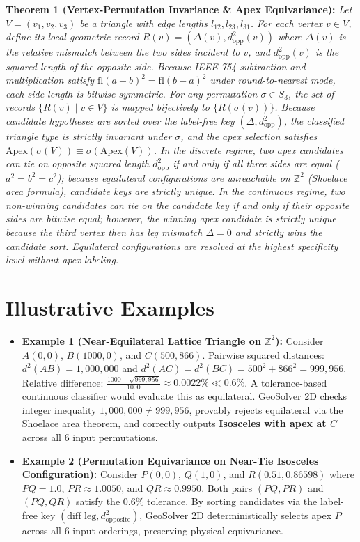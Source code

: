 \documentclass[preprint,12pt]{elsarticle}
\begin{document}
\textbf{Theorem 1 (Vertex-Permutation Invariance \& Apex Equivariance):}  
\textit{Let $V = (v_1, v_2, v_3)$ be a triangle with edge lengths $l_{12}, l_{23}, l_{31}$. For each vertex $v \in V$, define its local geometric record $R(v) = (\Delta(v), d^2_{\text{opp}}(v))$ where $\Delta(v)$ is the relative mismatch between the two sides incident to $v$, and $d^2_{\text{opp}}(v)$ is the squared length of the opposite side. Because IEEE-754 subtraction and multiplication satisfy $\text{fl}(a - b)^2 = \text{fl}(b - a)^2$ under round-to-nearest mode, each side length is bitwise symmetric. For any permutation $\sigma \in S_3$, the set of records $\{R(v) \mid v \in V\}$ is mapped bijectively to $\{R(\sigma(v))\}$. Because candidate hypotheses are sorted over the label-free key $(\Delta, d^2_{\text{opp}})$, the classified triangle type is strictly invariant under $\sigma$, and the apex selection satisfies $\text{Apex}(\sigma(V)) \equiv \sigma(\text{Apex}(V))$. In the discrete regime, two apex candidates can tie on opposite squared length $d^2_{\text{opp}}$ if and only if all three sides are equal ($a^2 = b^2 = c^2$); because equilateral configurations are unreachable on $\mathbb{Z}^2$ (Shoelace area formula), candidate keys are strictly unique. In the continuous regime, two non-winning candidates can tie on the candidate key if and only if their opposite sides are bitwise equal; however, the winning apex candidate is strictly unique because the third vertex then has leg mismatch $\Delta = 0$ and strictly wins the candidate sort. Equilateral configurations are resolved at the highest specificity level without apex labeling.}

\section{Illustrative Examples}
\begin{itemize}
    \item \textbf{Example 1 (Near-Equilateral Lattice Triangle on $\mathbb{Z}^2$):} Consider $A(0, 0)$, $B(1000, 0)$, and $C(500, 866)$. Pairwise squared distances: $d^2(AB) = 1,000,000$ and $d^2(AC) = d^2(BC) = 500^2 + 866^2 = 999,956$. Relative difference: $\frac{1000 - \sqrt{999,956}}{1000} \approx 0.0022\% \ll 0.6\%$. A tolerance-based continuous classifier would evaluate this as equilateral. GeoSolver 2D checks integer inequality $1,000,000 \ne 999,956$, provably rejects equilateral via the Shoelace area theorem, and correctly outputs \textbf{Isosceles with apex at $C$} across all 6 input permutations.
    \item \textbf{Example 2 (Permutation Equivariance on Near-Tie Isosceles Configuration):} Consider $P(0, 0)$, $Q(1, 0)$, and $R(0.51, 0.86598)$ where $PQ = 1.0$, $PR \approx 1.0050$, and $QR \approx 0.9950$. Both pairs $(PQ, PR)$ and $(PQ, QR)$ satisfy the $0.6\%$ tolerance. By sorting candidates via the label-free key $(\text{diff\_leg}, d^2_{\text{opposite}})$, GeoSolver 2D deterministically selects apex $P$ across all 6 input orderings, preserving physical equivariance.
\end{itemize}
\end{document}
